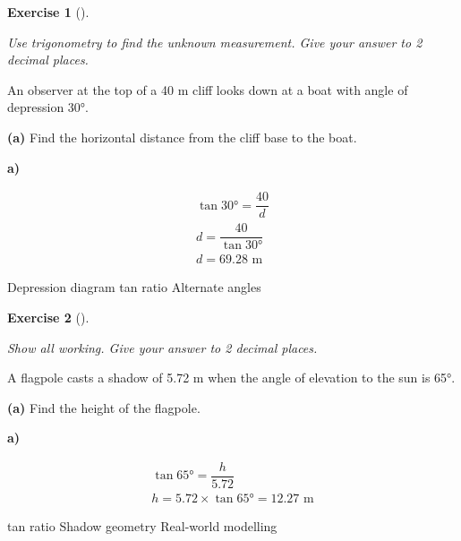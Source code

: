 \documentclass[
  letterpaper,
  DIV=11,
  numbers=noendperiod]{scrreprt}
\theoremstyle{definition}
\newtheorem{exercise}{Exercise}[chapter]
\theoremstyle{remark}
\begin{document}
\begin{exercise}[]\protect\hypertarget{exr-trig-14}{}\label{exr-trig-14}

\emph{Use trigonometry to find the unknown measurement. Give your answer
to 2 decimal places.}

An observer at the top of a 40 m cliff looks down at a boat with angle
of depression 30°.

\textbf{(a)} Find the horizontal distance from the cliff base to the
boat.

\begin{tcolorbox}[enhanced jigsaw, opacitybacktitle=0.6, coltitle=black, arc=.35mm, colframe=quarto-callout-tip-color-frame, colback=white, bottomrule=.15mm, left=2mm, colbacktitle=quarto-callout-tip-color!10!white, titlerule=0mm, opacityback=0, title=\textcolor{quarto-callout-tip-color}{\faLightbulb}\hspace{0.5em}{🔍 View Solution}, leftrule=.75mm, breakable, rightrule=.15mm, bottomtitle=1mm, toptitle=1mm, toprule=.15mm]

\textbf{a)}

\[
\begin{aligned}
\tan 30° = \dfrac{40}{d} \\ d = \dfrac{40}{\tan 30°} \\ d = 69.28 \text{ m}
\end{aligned}
\]

\end{tcolorbox}

{Depression diagram} {tan ratio} {Alternate angles}

\end{exercise}

\begin{exercise}[]\protect\hypertarget{exr-trig-17}{}\label{exr-trig-17}

\emph{Show all working. Give your answer to 2 decimal places.}

A flagpole casts a shadow of 5.72 m when the angle of elevation to the
sun is 65°.

\textbf{(a)} Find the height of the flagpole.

\begin{tcolorbox}[enhanced jigsaw, opacitybacktitle=0.6, coltitle=black, arc=.35mm, colframe=quarto-callout-tip-color-frame, colback=white, bottomrule=.15mm, left=2mm, colbacktitle=quarto-callout-tip-color!10!white, titlerule=0mm, opacityback=0, title=\textcolor{quarto-callout-tip-color}{\faLightbulb}\hspace{0.5em}{🔍 View Solution}, leftrule=.75mm, breakable, rightrule=.15mm, bottomtitle=1mm, toptitle=1mm, toprule=.15mm]

\textbf{a)}

\[
\begin{aligned}
\tan 65° = \dfrac{h}{5.72} \\ h = 5.72 \times \tan 65° = 12.27 \text{ m}
\end{aligned}
\]

\end{tcolorbox}

{tan ratio} {Shadow geometry} {Real-world modelling}

\end{exercise}
\end{document}
